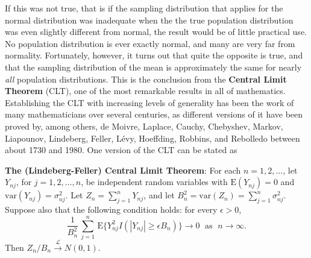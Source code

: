 If this was not true, that is if the sampling distribution
that applies for the normal distribution was inadequate when the the true
population distribution was even slightly different from normal, the
result would be of little practical use. No population
distribution is ever exactly normal, and many are very far from
normality. Fortunately, however, it turns out that quite the opposite is
true, and that the sampling distribution of the mean is approximately
the same for nearly \emph{all} population distributions. This is the
conclusion from the \textbf{Central Limit Theorem} (CLT), one of the
most remarkable results in all of mathematics. Establishing the CLT with
increasing levels of generality has been the work of many mathematicians
over several centuries, as different versions of it have been proved by,
among others, de Moivre, Laplace, Cauchy, Chebyshev, Markov, Liapounov,
Lindeberg, Feller, L\'{e}vy, Hoeffding, Robbins, and Rebolledo between
about 1730 and 1980. One version of the CLT can be stated as

\textbf{The (Lindeberg-Feller) Central Limit Theorem}: For each
$n=1,2,\dots$, let $Y_{nj}$, for $j=1,2,\dots,n$, be independent random
variables with $\text{E}(Y_{nj})=0$ and $\text{var}(Y_{nj})=\sigma^{2}_{nj}$. Let
$Z_{n}=\sum_{j=1}^{n} Y_{nj}$, and let
$B^{2}_{n}=\text{var}(Z_{n})=\sum_{j=1}^{n} \sigma^{2}_{nj}$. Suppose also
that the following condition holds: for every $\epsilon>0$,
\begin{equation}
\frac{1}{B_{n}^{2}}\,
\sum_{j=1}^{n} \, \text{E}\{ Y_{nj}^{2} I(|Y_{nj}|\ge \epsilon B_{n})\}
\rightarrow 0 \; \text{  as  } \; n\rightarrow \infty.
\label{lindeberg}
\end{equation}
Then $Z_{n}/B_{n} \stackrel{\mathcal{L}}{\longrightarrow} N(0,1)$.

